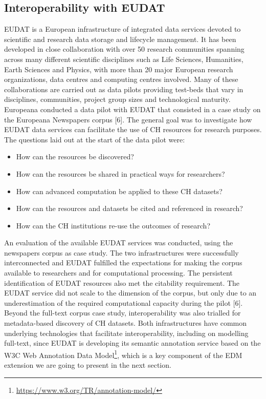 \documentclass[a4paper,UKenglish,cleveref, autoref]{oasics-v2019}
\begin{document}
\subsection{Interoperability with EUDAT}
\label{sec:interoperabilitywitheudat}
EUDAT is a European infrastructure of integrated data services devoted to scientific and research data storage and lifecycle management. It has been developed in close collaboration with over 50 research communities spanning across many different scientific disciplines such as Life Sciences, Humanities, Earth Sciences and Physics, with more than 20 major European research organizations, data centres and computing centres involved. Many of these collaborations are carried out as data pilots providing test-beds that vary in disciplines, communities, project group sizes and technological maturity. Europeana conducted a data pilot with EUDAT that consisted in a case study on the Europeana Newspapers corpus [6]. The general goal was to investigate how EUDAT data services can facilitate the use of CH resources for research purposes. The questions laid out at the start of the data pilot were:
\begin{itemize}
\item How can the resources be discovered?
\item How can the resources be shared in practical ways for researchers? 
\item How can advanced computation be applied to these CH datasets? 
\item How can the resources and datasets be cited and referenced in research?
\item How can the CH institutions re-use the outcomes of research?
\end{itemize}

An evaluation of the available EUDAT services was conducted, using the newspapers corpus as case study. The two infrastructures were successfully interconnected and EUDAT fulfilled the expectations for making the corpus available to researchers and for computational processing. The persistent identification of EUDAT resources also met the citability requirement. The EUDAT service did not scale to the dimension of the corpus, but only due to an underestimation of the required computational capacity during the pilot [6]. Beyond the full-text corpus case study, interoperability was also trialled for metadata-based discovery of CH datasets. Both infrastructures have common underlying technologies that facilitate interoperability, including on modelling full-text, since EUDAT is developing its semantic annotation service based on the W3C Web Annotation Data 
Model\footnote{\url{https://www.w3.org/TR/annotation-model/}},
which is a key component of the EDM extension we are going to present in the next section.
\end{document}
